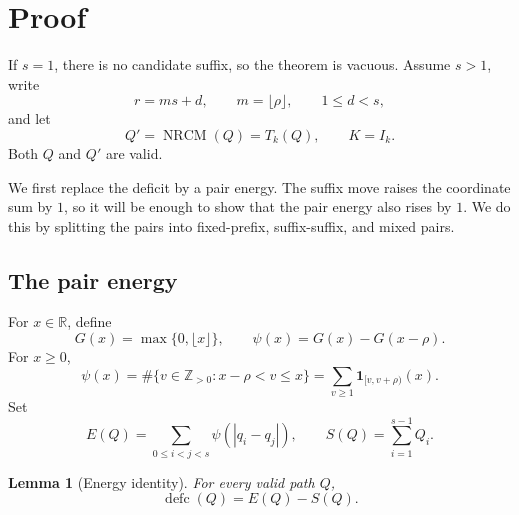 \documentclass[10pt]{article}
\newtheorem{lemma}{Lemma}[section]
\newcommand{\defc}{\operatorname{defc}}
\newcommand{\NRCM}{\operatorname{NRCM}}
\newcommand{\ind}{\mathbf 1}
\begin{document}
\section{Proof}

If \(s=1\), there is no candidate suffix, so the theorem is vacuous.  Assume
\(s>1\), write
\[
  r=ms+d,
  \qquad
  m=\lfloor\rho\rfloor,
  \qquad
  1\le d<s,
\]
and let
\[
  Q'=\NRCM(Q)=T_k(Q),
  \qquad
  K=I_k.
\]
Both \(Q\) and \(Q'\) are valid.

We first replace the deficit by a pair energy.  The suffix move raises the
coordinate sum by \(1\), so it will be enough to show that the pair energy
also rises by \(1\).  We do this by splitting the pairs into fixed-prefix,
suffix-suffix, and mixed pairs.

\subsection{The pair energy}

For \(x\in\mathbb R\), define
\[
  G(x)=\max\{0,\lfloor x\rfloor\},
  \qquad
  \psi(x)=G(x)-G(x-\rho).
\]
For \(x\ge0\),
\begin{equation}
  \psi(x)
  =\#\{v\in\mathbb Z_{>0}:x-\rho<v\le x\}
  =\sum_{v\ge1}\ind_{[v,v+\rho)}(x).
  \label{eq:psi-intervals}
\end{equation}
Set
\[
  E(Q)=\sum_{0\le i<j<s}\psi(|q_i-q_j|),
  \qquad
  S(Q)=\sum_{i=1}^{s-1}Q_i.
\]

\begin{lemma}[Energy identity]
\label{lem:energy}
For every valid path \(Q\),
\begin{equation}
  \defc(Q)=E(Q)-S(Q).
  \label{eq:energy-identity}
\end{equation}
\end{lemma}
\end{document}

